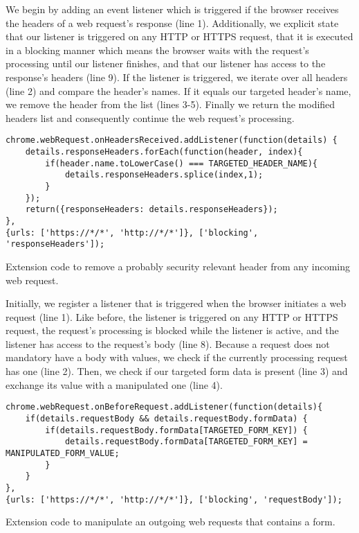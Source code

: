 	We begin by adding an event listener which is triggered if the browser receives the headers of a web request's response (line 1). Additionally, we explicit state that our listener is triggered on any HTTP or HTTPS request, that it is executed in a blocking manner which means the browser waits with the request's processing until our listener finishes, and that our listener has access to the response's headers (line 9). If the listener is triggered, we iterate over all headers (line 2) and compare the header's names. If it equals our targeted header's name, we remove the header from the list (lines 3-5). Finally we return the modified headers list and consequently continue the web request's processing. 

	\begin{code}
		\begin{lstlisting}
chrome.webRequest.onHeadersReceived.addListener(function(details) { 
	details.responseHeaders.forEach(function(header, index){
		if(header.name.toLowerCase() === TARGETED_HEADER_NAME){
			details.responseHeaders.splice(index,1);
		}
	});
	return({responseHeaders: details.responseHeaders});
},
{urls: ['https://*/*', 'http://*/*']}, ['blocking', 'responseHeaders']);
\end{lstlisting}
		\caption{Extension code to remove a probably security relevant header from any incoming web request.}
		\label{code:removeHTTPResponseHeader}
	\end{code} 

	Initially, we register a listener that is triggered when the browser initiates a web request (line 1). Like before, the listener is triggered on any HTTP or HTTPS request, the request's processing is blocked while the listener is active, and the listener has access to the request's body (line 8). Because a request does not mandatory have a body with values, we check if the currently processing request has one (line 2). Then, we check if our targeted form data is present (line 3) and exchange its value with a manipulated one (line 4). 
	
	\begin{code}
		\begin{lstlisting}
chrome.webRequest.onBeforeRequest.addListener(function(details){
	if(details.requestBody && details.requestBody.formData) {
		if(details.requestBody.formData[TARGETED_FORM_KEY]) {
			details.requestBody.formData[TARGETED_FORM_KEY] = MANIPULATED_FORM_VALUE;
		}
	}
},
{urls: ['https://*/*', 'http://*/*']}, ['blocking', 'requestBody']);
\end{lstlisting}
		\caption{Extension code to manipulate an outgoing web requests that contains a form.}
		\label{code:manipulateWebRequestForm}
	\end{code}
	
